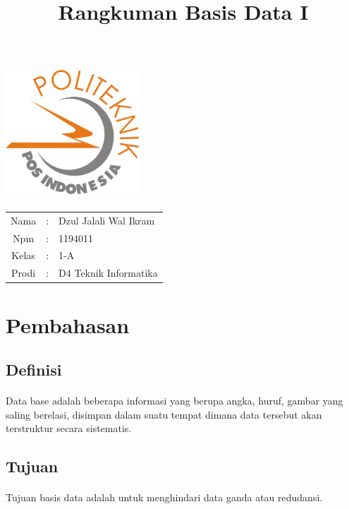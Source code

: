 \documentclass[a4paper]{article}
\title{Rangkuman Basis Data I}
\begin{document}
	\maketitle
	
\begin{center}
	\includegraphics[width=5cm,height=5cm]{logo-poltekpos.png}\\
\end{center}
\begin{center}
		\begin{tabular}{c c l}
		
		
		Nama & : & Dzul Jalali Wal Ikram \\
		Npm & : & 1194011 \\
		Kelas & : & 1-A \\
		Prodi & : & D4 Teknik Informatika \\
	\end{tabular}
\end{center}
\newpage

	\section{Pembahasan}
	\subsection{Definisi}
	\paragraph{}
	Data base adalah beberapa informasi yang berupa angka, huruf, gambar yang saling berelasi, disimpan dalam suatu tempat dimana data tersebut akan terstruktur secara sistematis.
	\subsection{Tujuan}
	\paragraph{}
	Tujuan basis data adalah untuk menghindari data ganda atau redudansi.
\end{document}
